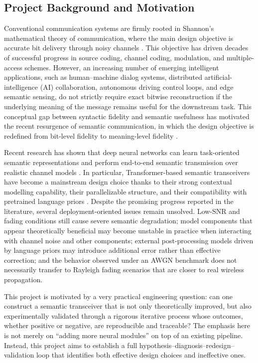 \subsection{Project Background and Motivation}

Conventional communication systems are firmly rooted in Shannon's mathematical theory of communication, where the main design objective is accurate bit delivery through noisy channels \cite{shannon1948, shannon1948part2}. This objective has driven decades of successful progress in source coding, channel coding, modulation, and multiple-access schemes. However, an increasing number of emerging intelligent applications, such as human--machine dialog systems, distributed artificial-intelligence (AI) collaboration, autonomous driving control loops, and edge semantic sensing, do not strictly require exact bitwise reconstruction if the underlying meaning of the message remains useful for the downstream task. This conceptual gap between syntactic fidelity and semantic usefulness has motivated the recent resurgence of semantic communication, in which the design objective is redefined from bit-level fidelity to meaning-level fidelity \cite{carnap1954, bao2011semantic}.

Recent research has shown that deep neural networks can learn task-oriented semantic representations and perform end-to-end semantic transmission over realistic channel models \cite{xie2021deepsc, lu2024survey}. In particular, Transformer-based semantic transceivers have become a mainstream design choice thanks to their strong contextual modelling capability, their parallelizable structure, and their compatibility with pretrained language priors \cite{vaswani2017attention}. Despite the promising progress reported in the literature, several deployment-oriented issues remain unsolved. Low-SNR and fading conditions still cause severe semantic degradation; model components that appear theoretically beneficial may become unstable in practice when interacting with channel noise and other components; external post-processing models driven by language priors may introduce additional error rather than effective correction; and the behavior observed under an AWGN benchmark does not necessarily transfer to Rayleigh fading scenarios that are closer to real wireless propagation.

This project is motivated by a very practical engineering question: can one construct a semantic transceiver that is not only theoretically improved, but also experimentally validated through a rigorous iterative process whose outcomes, whether positive or negative, are reproducible and traceable? The emphasis here is not merely on ``adding more neural modules'' on top of an existing pipeline. Instead, this project aims to establish a full hypothesis--diagnosis--redesign--validation loop that identifies both effective design choices and ineffective ones.


